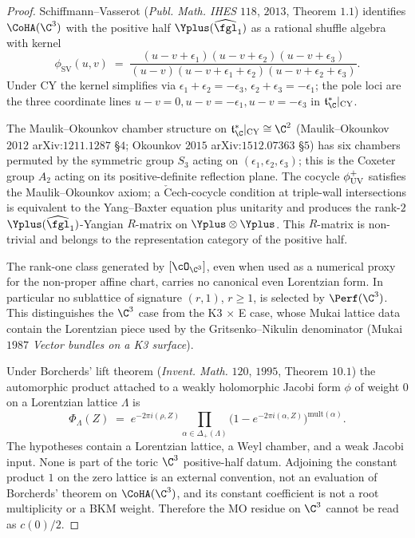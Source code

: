 \begin{proof}
Schiffmann--Vasserot
(\textit{Publ. Math. IHES} $118$, $2013$, Theorem $1.1$) identifies
\(\CoHA(\C^3)\) with the positive half
\(\Yplus(\widehat{\fgl}_1)\) as a rational shuffle algebra with kernel
\[
 \phi_{\mathrm{SV}}(u, v) \;=\;
 \frac{(u - v + \epsilon_1)(u - v + \epsilon_2)(u - v + \epsilon_3)}
 {(u - v)(u - v + \epsilon_1 + \epsilon_2)
 (u - v + \epsilon_2 + \epsilon_3)}.
\]
Under CY the kernel simplifies via $\epsilon_1 + \epsilon_2 = -\epsilon_3$,
$\epsilon_2 + \epsilon_3 = -\epsilon_1$; the pole loci are the three
coordinate lines $u - v = 0, u - v = -\epsilon_1, u - v = -\epsilon_3$
in $\mathfrak t^*_\C|_{\mathrm{CY}}$.

The Maulik--Okounkov chamber structure on
$\mathfrak t^*_\C|_{\mathrm{CY}} \cong \C^2$ (Maulik--Okounkov $2012$
arXiv:$1211.1287$ \S $4$; Okounkov $2015$ arXiv:$1512.07363$ \S $5$)
has six chambers permuted by the symmetric group $S_3$ acting on
$(\epsilon_1, \epsilon_2, \epsilon_3)$; this is the Coxeter group
$A_2$ acting on its positive-definite reflection plane. The cocycle
$\phi^{+}_{\mathrm{UV}}$ satisfies the Maulik--Okounkov axiom; a
$\check{\mathrm{C}}$ech-cocycle condition at triple-wall intersections
is equivalent to the Yang--Baxter equation plus unitarity and produces
the rank-$2$ $\Yplus(\widehat{\fgl}_1)$-Yangian $R$-matrix on
$\Yplus \otimes \Yplus$. This $R$-matrix is non-trivial and belongs to
the representation category of the positive half.

The rank-one class generated by \([\cO_{\C^3}]\), even when used as a
numerical proxy for the non-proper affine chart, carries no canonical
even Lorentzian form. In particular no sublattice of signature
\((r,1)\), \(r\ge 1\), is selected by \(\Perf(\C^3)\). This
distinguishes the \(\C^3\) case from the K3 \(\times\) E case, whose
Mukai lattice data contain the Lorentzian piece used by the
Gritsenko--Nikulin denominator (Mukai $1987$ \textit{Vector bundles on
a K3 surface}).

Under Borcherds' lift theorem (\textit{Invent. Math.} $120$, $1995$,
Theorem $10.1$) the automorphic product attached to a weakly
holomorphic Jacobi form $\phi$ of weight $0$ on a Lorentzian lattice
$\Lambda$ is
\[
 \Phi_\Lambda(Z) \;=\; e^{-2\pi i (\rho, Z)}
 \prod_{\alpha \in \Delta_+(\Lambda)}
 \bigl(1 - e^{-2\pi i (\alpha, Z)}\bigr)^{\mathrm{mult}(\alpha)}.
\]
The hypotheses contain a Lorentzian lattice, a Weyl chamber, and a
weak Jacobi input. None is part of the toric \(\C^3\) positive-half
datum. Adjoining the constant product \(1\) on the zero lattice is an
external convention, not an evaluation of Borcherds' theorem on
\(\CoHA(\C^3)\), and its constant coefficient is not a root
multiplicity or a BKM weight. Therefore the MO residue on \(\C^3\)
cannot be read as \(c(0)/2\).
\end{proof}

